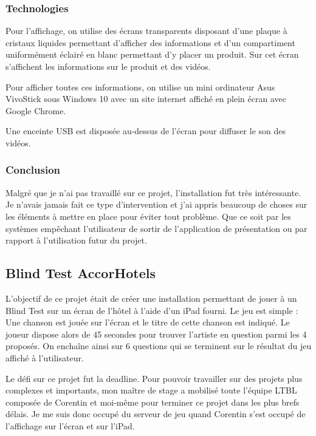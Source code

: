 \documentclass{article}
\begin{document}
\subsubsection{Technologies}

Pour l'affichage, on utilise des écrans transparents disposant d'une plaque à cristaux liquides permettant d'afficher des informations et d'un compartiment uniformément éclairé en blanc permettant d'y placer un produit.
Sur cet écran s'affichent les informations sur le produit et des vidéos.

Pour afficher toutes ces informations, on utilise un mini ordinateur Asus VivoStick sous Windows 10 avec un site internet affiché en plein écran avec Google Chrome.

Une enceinte USB est disposée au-dessus de l'écran pour diffuser le son des vidéos.

\subsubsection{Conclusion}

Malgré que je n'ai pas travaillé sur ce projet, l'installation fut très intéressante.
Je n'avais jamais fait ce type d'intervention et j'ai appris beaucoup de choses sur les éléments à mettre en place pour éviter tout problème.
Que ce soit par les systèmes empêchant l'utilisateur de sortir de l'application de présentation ou par rapport à l'utilisation futur du projet.

\subsection{Blind Test AccorHotels}

L'objectif de ce projet était de créer une installation permettant de jouer à un Blind Test sur un écran de l'hôtel à l'aide d'un iPad fourni.
Le jeu est simple : Une chanson est jouée sur l'écran et le titre de cette chanson est indiqué.
Le joueur dispose alors de 45 secondes pour trouver l'artiste en question parmi les 4 proposés.
On enchaîne ainsi sur 6 questions qui se terminent sur le résultat du jeu affiché à l'utilisateur.

Le défi sur ce projet fut la deadline.
Pour pouvoir travailler sur des projets plus complexes et importants, mon maître de stage a mobilisé toute l'équipe LTBL composée de Corentin et moi-même pour terminer ce projet dans les plus brefs délais.
Je me suis donc occupé du serveur de jeu quand Corentin s'est occupé de l'affichage sur l'écran et sur l'iPad.
\end{document}
